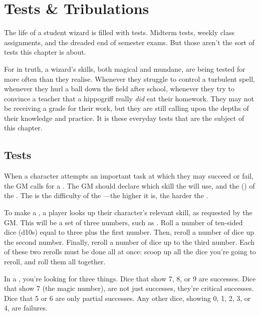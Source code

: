 \chapter{Tests \& Tribulations}


The life of a student wizard is filled with tests.
Midterm tests, weekly class assignments, and the dreaded end of semester exams.
But those aren't the sort of tests this chapter is about.

For in truth, a wizard's skills, both magical and mundane, are being tested for more often than they realise.
Whenever they struggle to control a turbulent spell,
whenever they hurl a ball down the field after school,
whenever they try to convince a teacher that a hippogriff really \emph{did} eat their homework.
They may not be receiving a grade for their work, but they are still calling upon the depths of their knowledge and practice.
It is these everyday tests that are the subject of this chapter.

\section{Tests}

When a character attempts an important task at which they may succeed or fail, the GM calls for a {\test}.
The GM should declare which skill the {\test} will use, and the {\targetnumber} ({\tn}) of the {\test}.
The {\targetnumber} is the difficulty of the {\test}---the higher it is, the harder the {\test}.

To make a {\test}, a player looks up their character's relevant skill, as requested by the GM.
This will be a set of three numbers, such as .
Roll a number of ten-sided dice (d10s) equal to three plus the first number.
Then, reroll a number of dice up the second number.
Finally, reroll a number of dice up to the third number.
Each of these two rerolls must be done all at once: scoop up all the dice you're going to reroll, and roll them all together.

In a {\test}, you're looking for three things.
Dice that show 7, 8, or 9 are successes.
Dice that show 7 (the magic number), are not just successes, they're critical successes.
Dice that 5 or 6 are only partial successes.
Any other dice, showing 0, 1, 2, 3, or 4, are failures.

